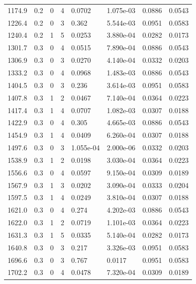 \documentclass[preview]{standalone}
\begin{document}
{{{\begin{tabular}{L{1.2cm}C{1.2cm} C{0.3cm}C{0.5cm} C{1.4cm}C{1.4cm} C{1.4cm}C{1.4cm}}
  1174.9  &   0.2  & 0     &  4 &  0.0702  & 1.075e-03  & 0.0886 &  0.0543   \\ 
  1226.4  &   0.2  & 0     &  3 &  0.362  & 5.544e-03  & 0.0951 &  0.0583   \\ 
  1240.4  &   0.2  & 1     &  5 &  0.0253  & 3.880e-04  & 0.0282 &  0.0173   \\ 
  1301.7  &   0.3  & 0     &  4 &  0.0515  & 7.890e-04  & 0.0886 &  0.0543   \\ 
  1306.9  &   0.3  & 0     &  3 &  0.0270  & 4.140e-04  & 0.0332 &  0.0203   \\ 
  1333.2  &   0.3  & 0     &  4 &  0.0968  & 1.483e-03  & 0.0886 &  0.0543   \\ 
  1404.5  &   0.3  & 0     &  3 &  0.236  & 3.614e-03  & 0.0951 &  0.0583   \\ 
  1407.8  &   0.3  & 1     &  2 &  0.0467  & 7.140e-04  & 0.0364 &  0.0223   \\ 
  1417.4  &   0.3  & 1     &  4 &  0.0707  & 1.082e-03  & 0.0307 &  0.0188   \\ 
  1422.9  &   0.3  & 0     &  4 &  0.305  & 4.665e-03  & 0.0886 &  0.0543   \\ 
  1454.9  &   0.3  & 1     &  4 &  0.0409  & 6.260e-04  & 0.0307 &  0.0188   \\ 
  1497.6  &   0.3  & 0     &  3 &  1.055e-04  & 2.000e-06  & 0.0332 &  0.0203   \\ 
  1538.9  &   0.3  & 1     &  2 &  0.0198  & 3.030e-04  & 0.0364 &  0.0223   \\ 
  1556.6  &   0.3  & 0     &  4 &  0.0597  & 9.150e-04  & 0.0309 &  0.0189   \\ 
  1567.9  &   0.3  & 1     &  3 &  0.0202  & 3.090e-04  & 0.0333 &  0.0204   \\ 
  1597.5  &   0.3  & 1     &  4 &  0.0249  & 3.810e-04  & 0.0307 &  0.0188   \\ 
  1621.0  &   0.3  & 0     &  4 &  0.274  & 4.202e-03  & 0.0886 &  0.0543   \\ 
  1622.0  &   0.3  & 1     &  2 &  0.0719  & 1.101e-03  & 0.0364 &  0.0223   \\ 
  1631.3  &   0.3  & 1     &  5 &  0.0335  & 5.140e-04  & 0.0282 &  0.0173   \\ 
  1640.8  &   0.3  & 0     &  3 &  0.217  & 3.326e-03  & 0.0951 &  0.0583   \\ 
  1696.6  &   0.3  & 0     &  3 &  0.767  & 0.0117  & 0.0951 &  0.0583   \\ 
  1702.2  &   0.3  & 0     &  4 &  0.0478  & 7.320e-04  & 0.0309 &  0.0189   \\ 

\end{tabular}}}}
\end{document}

